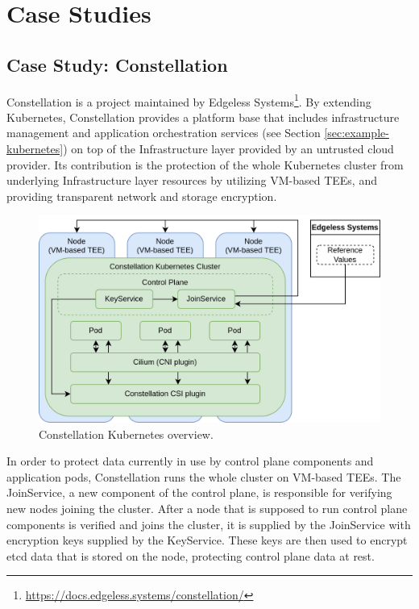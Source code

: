 \section{Case Studies}
\label{sec:case-studies}

\subsection{Case Study: Constellation}

Constellation is a project maintained by Edgeless
Systems\footnote{\url{https://docs.edgeless.systems/constellation/}}. By
extending Kubernetes, Constellation provides a platform base that includes
infrastructure management and application orchestration services (see Section
\ref{sec:example-kubernetes}) on top of the Infrastructure layer provided by an
untrusted cloud provider. Its contribution is the protection of the whole
Kubernetes cluster from underlying Infrastructure layer resources by utilizing
VM-based TEEs, and providing transparent network and storage encryption.

\begin{figure}[H]
  \centering
  \includegraphics[width=0.8\linewidth]{resources/constellation-kubernetes.drawio.png}
  \caption{Constellation Kubernetes overview.}
\end{figure}

In order to protect data currently in use by control plane components and
application pods, Constellation runs the whole cluster on VM-based TEEs. The
JoinService, a new component of the control plane, is responsible for verifying
new nodes joining the cluster. After a node that is supposed to run control
plane components is verified and joins the cluster, it is supplied by the
JoinService with encryption keys supplied by the KeyService. These keys are then
used to encrypt etcd data that is stored on the node, protecting control plane
data at rest.

